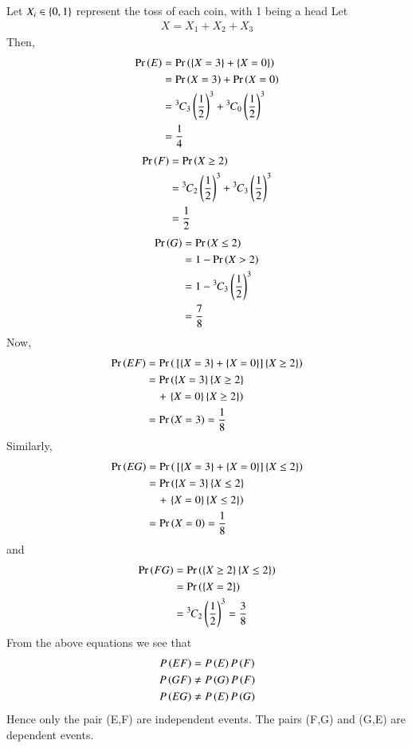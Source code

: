 Let $X_i \in \left\{0,1\right\}$ represent the toss of each coin, with 1 being a head  Let
\begin{align}
X = X_1 + X_2 + X_3
\end{align}
Then, 
\begin{align}
\Pr\left(E\right) &= \Pr\left(\left\{X = 3\right\}+ \left\{X = 0\right\} \right)
\\
&= \Pr\left(X = 3\right)+ \Pr\left(X = 0\right) 
\\
&= {{}^{3}\mkern-1muC_{3}}\left(\frac{1}{2}\right)^3+{{}^{3}\mkern-1muC_{0}}\left(\frac{1}{2}\right)^3 
\\
&= \frac{1}{4}
\end{align}
\begin{align}
\Pr\left(F\right) &= \Pr\left(X \ge 2\right)
\\
&= {{}^{3}\mkern-1muC_{2}}\left(\frac{1}{2}\right)^3+{{}^{3}\mkern-1muC_{3}}\left(\frac{1}{2}\right)^3 
\\
&= \frac{1}{2}
\end{align}
\begin{align}
\Pr\left(G\right) &= \Pr\left(X \le 2\right)
\\
&= 1 - \Pr\left(X > 2\right)
\\
&=1 - {{}^{3}\mkern-1muC_{3}}\left(\frac{1}{2}\right)^3
\\
&= \frac{7}{8}
\end{align}
Now, 
\begin{align}
\Pr\left(EF\right) &= \Pr\left({}\left[\left\{X = 3\right\}+\left\{X = 0\right\}\right]\left\{X \ge 2\right\}\right)
\\
&= \Pr\left(\left\{X = 3\right\}\left\{X \ge 2\right\}\right.
\\
&\quad +\left.\left\{X = 0\right\}\left\{X \ge 2\right\}\right)
\\
&=\Pr\left(X = 3\right) = \frac{1}{8}
\label{eq:2122_EF}
\end{align}
Similarly,
\begin{align}
\Pr\left(EG\right) &= \Pr\left({}\left[\left\{X = 3\right\}+\left\{X = 0\right\}\right]\left\{X \le 2\right\}\right)
\\
&= \Pr\left(\left\{X = 3\right\}\left\{X \le 2\right\}\right.
\\
&\quad +\left.\left\{X = 0\right\}\left\{X \le 2\right\}\right)
\\
&=\Pr\left(X = 0\right) = \frac{1}{8}
\label{eq:2122_EG}
\end{align}
and
\begin{align}
\Pr\left(FG\right) &= \Pr\left(\left\{X \ge 2\right\}\left\{X \le 2\right\}\right)
\\
&= \Pr\left(\left\{X = 2\right\}\right)
\\
&={{}^{3}\mkern-1muC_{2}}\left(\frac{1}{2}\right)^3 = \frac{3}{8}
\label{eq:2122_FG}
\end{align}
From the above equations we see that
\begin{align}
P\left(E F\right) &= P\left(E\right)P\left(F\right)\\
P\left(GF\right) &\neq P\left(G\right)P\left(F\right)\\
P\left(E G\right) &\neq P\left(E\right)P\left(G\right)
\end{align}
Hence only the pair (E,F) are independent events. The pairs (F,G) and (G,E) are dependent events.

